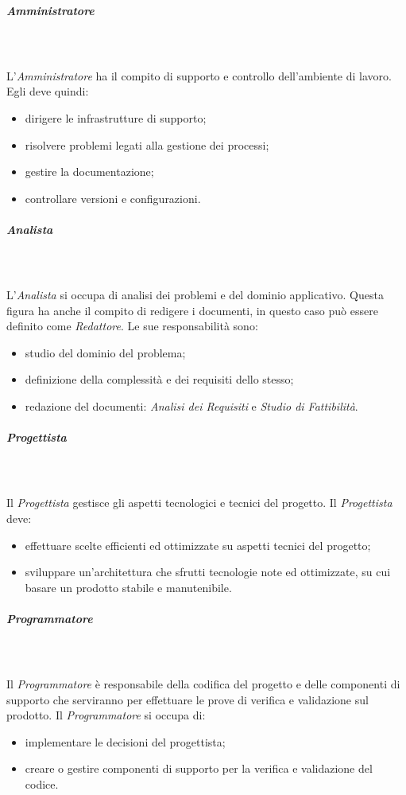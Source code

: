 \subparagraph*{Amministratore}\mbox{} \\ \mbox{} \\
L'\textit{Amministratore} ha il compito di supporto e controllo dell'ambiente di lavoro.
Egli deve quindi:
\begin{itemize}
	\item dirigere le infrastrutture di supporto;
	\item risolvere problemi legati alla gestione dei processi;
	\item gestire la documentazione;
	\item controllare versioni e configurazioni.
\end{itemize}

\subparagraph*{Analista}\mbox{} \\ \mbox{} \\
L'\textit{Analista} si occupa di analisi dei problemi e del dominio applicativo. Questa figura ha anche il compito di redigere i documenti, in questo caso può essere definito come \textit{Redattore}.
Le sue responsabilità sono:
\begin{itemize}
	\item studio del dominio del problema;
	\item definizione della complessità e dei requisiti dello stesso;
	\item redazione del documenti:\textit{ Analisi dei Requisiti} e \textit{Studio di Fattibilità}.
\end{itemize}

\subparagraph*{Progettista}\mbox{} \\ \mbox{} \\
Il \textit{Progettista} gestisce gli aspetti tecnologici e tecnici del progetto.
Il \textit{Progettista} deve:
\begin{itemize}
	\item effettuare scelte efficienti ed ottimizzate su aspetti tecnici del progetto;
	\item sviluppare un'architettura che sfrutti tecnologie note ed ottimizzate, su cui basare un prodotto stabile e manutenibile.
\end{itemize}

\subparagraph*{Programmatore}\mbox{} \\ \mbox{} \\
Il \textit{Programmatore} è responsabile della codifica del progetto e delle componenti di supporto che serviranno per effettuare le prove di verifica e validazione sul prodotto.
Il \textit{Programmatore} si occupa di:
\begin{itemize}
	\item implementare le decisioni del progettista;
	\item creare o gestire componenti di supporto per la verifica e validazione del codice.
\end{itemize}


